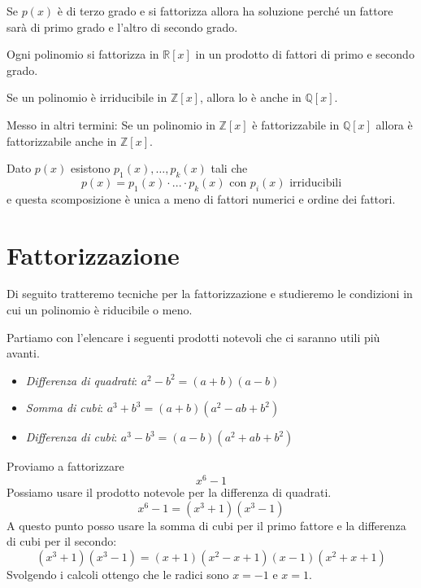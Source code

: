 \begin{observation}
	Se $p(x)$ \`e di terzo grado e si fattorizza allora ha soluzione perch\'e un fattore sar\`a
	di primo grado e l'altro di secondo grado.
\end{observation}

\begin{proposition}
	Ogni polinomio si fattorizza in $\mathbb{R}[x]$ in un prodotto di fattori di primo e secondo
	grado.
\end{proposition}

\begin{lemma}
	Se un polinomio \`e irriducibile in $\mathbb{Z}[x]$, allora lo \`e anche in
	$\mathbb{Q}[x]$.

	Messo in altri termini: Se un polinomio in $\mathbb{Z}[x]$ \`e fattorizzabile in
	$\mathbb{Q}[x]$ allora \`e fattorizzabile anche in $\mathbb{Z}[x]$.
\end{lemma}

\begin{theorem}
	Dato $p(x)$ esistono $p_1(x), \dots, p_k(x)$ tali che
	\begin{equation*}
		p(x) = p_1(x) \cdot ... \cdot p_k(x) \text{ con $p_i(x)$ irriducibili}
	\end{equation*}
	e questa scomposizione \`e unica a meno di fattori numerici e ordine dei fattori.
\end{theorem}

\section{Fattorizzazione}
Di seguito tratteremo tecniche per la fattorizzazione e studieremo le condizioni in cui
un polinomio \`e riducibile o meno.

Partiamo con l'elencare i seguenti prodotti notevoli che ci saranno utili pi\`u avanti.
\begin{itemize}
	\item \emph{Differenza di quadrati}: $a^2 - b^2 = (a + b)(a - b)$
	\item \emph{Somma di cubi}: $a^3 + b^3 = (a + b)(a^2 - ab + b^2)$
	\item \emph{Differenza di cubi}: $a^3 - b^3 = (a - b)(a^2 + ab + b^2)$
\end{itemize}

\begin{example}
	Proviamo a fattorizzare
	\begin{equation*}
		x^6 - 1
	\end{equation*}
	Possiamo usare il prodotto notevole per la differenza di quadrati.
	\begin{equation*}
		x^6 - 1 = (x^3 + 1)(x^3 - 1)
	\end{equation*}
	A questo punto posso usare la somma di cubi per il primo fattore e la differenza di cubi per
	il secondo:
	\begin{equation*}
		(x^3 + 1)(x^3 - 1) = (x + 1)(x^2 - x + 1)(x - 1)(x^2 + x + 1)
	\end{equation*}
	Svolgendo i calcoli ottengo che le radici sono $x = -1$ e $x = 1$.
\end{example}

